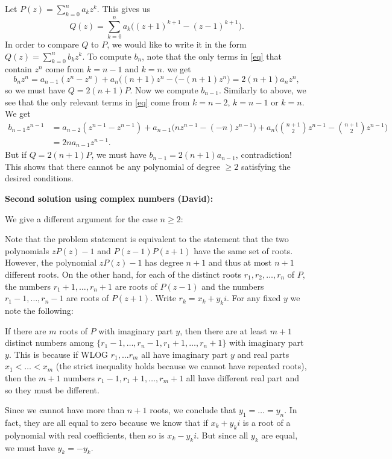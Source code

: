 {Let $P(z) = \sum_{k=0}^{n} a_k z^k$. This gives us 
\begin{equation}
\label{eq}
    Q(z) = \sum_{k=0}^{n} a_k \big( (z+1)^{k+1} - (z-1)^{k+1} \big). \tag{$\star$}
\end{equation}
In order to compare $Q$ to $P$, we would like to write it in the form $Q(z) = \sum_{k=0}^{n} b_k z^k$. To compute $b_n$, note that the only terms in \eqref{eq} that contain $z^n$ come from $k=n-1$ and $k=n$. we get 
\[ b_n z^n = a_{n-1}(z^n - z^n) + a_n\big( (n+1)z^n - (-(n+1)z^n \big) = 2(n+1)a_n z^n, \]
so we must have $Q = 2(n+1)P$. Now we compute $b_{n-1}$. Similarly to above, we see that the only relevant terms in \eqref{eq} come from $k=n-2$, $k=n-1$ or $k=n$. We get
\begin{align*}
b_{n-1} z^{n-1} &= a_{n-2}(z^{n-1}-z^{n-1}) + a_{n-1}\big(n z^{n-1} - (-n) z^{n-1} \big) + a_{n}\bigg( \binom{n+1}{2}z^{n-1} - \binom{n+1}{2}z^{n-1} \bigg) \\
&= 2n a_{n-1} z^{n-1}.
\end{align*}
But if $Q=2(n+1)P$, we must have $b_{n-1} = 2(n+1) a_{n-1}$, contradiction! This shows that there cannot be any polynomial of degree $\geq 2$ satisfying the desired conditions.

\newpage

\textbf{Second solution using complex numbers (David):}

We give a different argument for the case $n \geq 2$:

Note that the problem statement is equivalent to the statement that the two polynomials $zP(z)-1$ and $P(z-1)P(z+1)$ have the same set of roots. However, the polynomial $zP(z)-1$ has degree $n+1$ and thus at most $n+1$ different roots. On the other hand, for each of the distinct roots $r_1, r_2, \dots , r_n$ of $P$, the numbers $r_1 + 1, \dots , r_n + 1$ are roots of $P(z-1)$ and the numbers $r_1 - 1, \dots, r_n-1$ are roots of $P(z+1)$. Write $r_k = x_k + y_k i$. For any fixed $y$ we note the following: 

If there are $m$ roots of $P$ with imaginary part $y$, then there are at least $m+1$ distinct numbers among $\{r_1 - 1, \dots , r_n - 1, r_1+1, \dots, r_n+1\}$ with imaginary part $y$. This is because if WLOG $r_1, \dots r_m$ all have imaginary part $y$ and real parts $x_1 < \ldots < x_m$ (the strict inequality holds because we cannot have repeated roots), then the $m+1$ numbers $r_1 - 1, r_1 + 1, \dots , r_m + 1$ all have different real part and so they must be different.

Since we cannot have more than $n+1$ roots, we conclude that $y_1 = \ldots = y_n$. In fact, they are all equal to zero because we know that if $x_k + y_ki$ is a root of a polynomial with real coefficients, then so is $x_k - y_ki$. But since all $y_k$ are equal, we must have $y_k = -y_k$.

}
